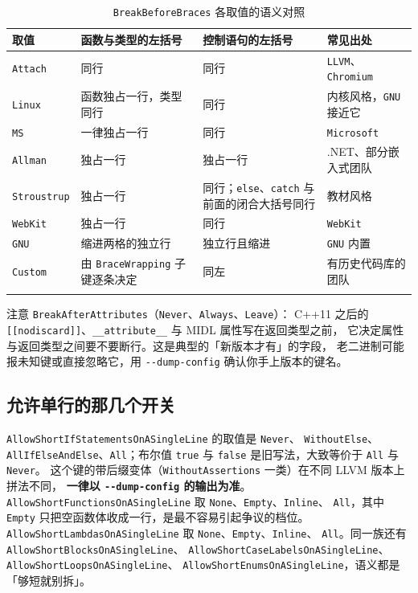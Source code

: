 \documentclass[12pt,a4paper,fontset=fandol]{ctexbook}
\newcommand{\cpp}[1]{C++#1}
\newcommand{\Opt}[1]{\texttt{-\/-#1}}
\newcommand{\Bk}{\discretionary{}{}{}}
\begin{document}
{\small
\begin{longtable}{%
  >{\raggedright\arraybackslash}p{}%
  >{\raggedright\arraybackslash}p{}%
  >{\raggedright\arraybackslash}p{}%
  >{\raggedright\arraybackslash}p{}%
  }
  \toprule
  取值 & 函数与类型的左括号 & 控制语句的左括号 & 常见出处 \\
  \midrule
  \endhead
  \texttt{Attach} & 同行 & 同行 & \texttt{LLVM}、\texttt{Chromium} \\
  \texttt{Linux} & 函数独占一行，类型同行 & 同行 & 内核风格，\texttt{GNU} 接近它 \\
  \texttt{MS} & 一律独占一行 & 同行 & \texttt{Microsoft} \\
  \texttt{Allman} & 独占一行 & 独占一行 & .NET、部分嵌入式团队 \\
  \texttt{Stroustrup} & 独占一行 & 同行；\texttt{else}、\texttt{catch} 与前面的闭合大括号同行 & 教材风格 \\
  \texttt{WebKit} & 独占一行 & 同行 & \texttt{WebKit} \\
  \texttt{GNU} & 缩进两格的独立行 & 独立行且缩进 & \texttt{GNU} 内置 \\
  \texttt{Custom} & 由 \texttt{Brace\-Wrapping} 子键逐条决定 & 同左 & 有历史代码库的团队 \\
  \bottomrule
  \caption{\texttt{BreakBeforeBraces} 各取值的语义对照}
  \label{tab:ch09-braces}
\end{longtable}
}

注意 \texttt{BreakAfterAttributes}（\texttt{Never}、\texttt{Always}、\texttt{Leave}）：
\cpp{11} 之后的 \texttt{[[nodiscard]]}、\texttt{\_\_attribute\_\_} 与 MIDL 属性写在返回类型之前，
它决定属性与返回类型之间要不要断行。这是典型的「新版本才有」的字段，
老二进制可能报未知键或直接忽略它，用 \Opt{dump-config} 确认你手上版本的键名。

\subsection{允许单行的那几个开关}\label{sec:ch09-s3-short}

\texttt{Allow\-Short\-If\-State\-ments\-On\-ASingle{\Bk}Line} 的取值是 \texttt{Never}、
\texttt{WithoutElse}、\texttt{All{\Bk}If{\Bk}Else{\Bk}And{\Bk}Else}、\texttt{All}；布尔值 \texttt{true} 与
\texttt{false} 是旧写法，大致等价于 \texttt{All} 与 \texttt{Never}。
这个键的带后缀变体（\texttt{Without{\Bk}Assertions} 一类）在不同 LLVM 版本上拼法不同，
\textbf{一律以 \Opt{dump-config} 的输出为准}。
\texttt{Allow{\Bk}Short{\Bk}Functions{\Bk}OnASingle{\Bk}Line} 取 \texttt{None}、\texttt{Empty}、\texttt{Inline}、
\texttt{All}，其中 \texttt{Empty} 只把空函数体收成一行，是最不容易引起争议的档位。
\texttt{Allow{\Bk}Short{\Bk}Lambdas{\Bk}OnASingle{\Bk}Line} 取 \texttt{None}、\texttt{Empty}、\texttt{Inline}、
\texttt{All}。同一族还有 \texttt{Allow{\Bk}Short{\Bk}Blocks{\Bk}OnASingle{\Bk}Line}、
\texttt{Allow{\Bk}Short{\Bk}Case{\Bk}Labels{\Bk}OnASingle{\Bk}Line}、\texttt{Allow{\Bk}Short{\Bk}Loops{\Bk}OnASingle{\Bk}Line}、
\texttt{Allow{\Bk}Short{\Bk}Enums{\Bk}OnASingle{\Bk}Line}，语义都是「够短就别拆」。
\end{document}
